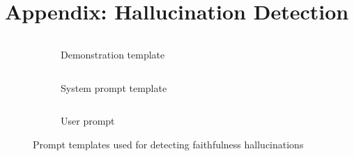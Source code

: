 \documentclass[english, 12pt, a4paper, sci, utf8, a-2b, online]{latex/definitions/aaltothesis}
\begin{document}
\clearpage

\section{Appendix: Hallucination Detection} \label{app:B}



\begin{figure}[!h]
%
\hfill\begin{minipage}[b][\ht0][s]{\wd0}%
\begin{subfigure}{\linewidth}
    \inputminted{text}{./minted_inputs/demonstration_template.txt}
    \caption{Demonstration template}
    \label{fig:demo_template}
\end{subfigure}\par
\vspace{0.5cm}
\begin{subfigure}{\linewidth}
    \inputminted{text}{./minted_inputs/detect_system_template.txt}
    \caption{System prompt template}
    \label{fig:detect_template}
\end{subfigure}\par
\vfill%
\begin{subfigure}[b]{\linewidth}
    \inputminted{text}{./minted_inputs/detect_user_prompt.txt}
    \caption{User prompt}
    \label{fig:detect_user_prompt}
\end{subfigure}
\end{minipage}
\caption{Prompt templates used for detecting faithfulness hallucinations}
\label{fig:detect_prompts}
\end{figure}
\end{document}
